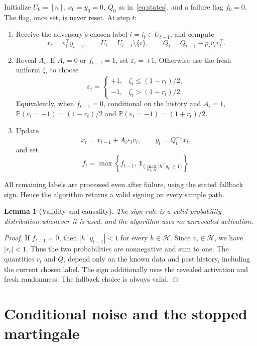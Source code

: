 \documentclass[11pt,a4paper]{article}
\numberwithin{equation}{section}
\newtheorem{lemma}[theorem]{Lemma}
\theoremstyle{remark}
\newcommand{\Pp}{\mathbb P}
\newcommand{\HH}{\mathcal H}
\newcommand{\ind}{\mathbf 1}
\begin{document}
Initialize $U_0=[n]$, $x_0=y_0=0$, $Q_0$ as in~\eqref{eq:states}, and a
failure flag $f_0=0$. The flag, once set, is never reset. At step $t$:
\begin{enumerate}
 \item Receive the adversary's chosen label $i=i_t\in U_{t-1}$, and compute
 \[
 r_t=v_i^\top y_{t-1},\qquad U_t=U_{t-1}\setminus\{i\},\qquad
 Q_t=Q_{t-1}-p_i v_iv_i^\top.
 \]
 \item Reveal $A_i$. If $A_i=0$ or $f_{t-1}=1$, set $\varepsilon_i=+1$.
 Otherwise use the fresh uniform $\zeta_t$ to choose
 \begin{equation}\label{eq:sign-rule}
 \varepsilon_i=
 \begin{cases}
 +1,&\zeta_t\le(1-r_t)/2,\\
 -1,&\zeta_t>(1-r_t)/2.
 \end{cases}
 \end{equation}
 Equivalently, when $f_{t-1}=0$, conditional on the history and $A_i=1$,
 $\Pp(\varepsilon_i=+1)=(1-r_t)/2$ and
 $\Pp(\varepsilon_i=-1)=(1+r_t)/2$.
 \item Update
 \[
 x_t=x_{t-1}+A_i\varepsilon_i v_i,\qquad y_t=Q_t^{-1}x_t,
 \]
 and set
 \begin{equation}\label{eq:failure-flag}
 f_t=\max\!\left\{f_{t-1},\,
 \ind_{\{\max_{h\in\HH}|h^\top y_t|\ge1\}}\right\}.
 \end{equation}
\end{enumerate}
All remaining labels are processed even after failure, using the stated
fallback sign. Hence the algorithm returns a valid signing on every
sample path.

\begin{lemma}[Validity and causality]
\label{lem:validity}
The sign rule is a valid probability distribution whenever it is used,
and the algorithm uses no unrevealed activation.
\end{lemma}
\begin{proof}
If $f_{t-1}=0$, then $|h^\top y_{t-1}|<1$ for every $h\in\HH$.
Since $v_i\in\HH$, we have $|r_t|<1$. Thus the two probabilities are
nonnegative and sum to one. The quantities $r_t$ and $Q_t$ depend only
on the known data and past history, including the current chosen label.
The sign additionally uses the revealed activation and fresh randomness.
The fallback choice is always valid.
\end{proof}

\section{Conditional noise and the stopped martingale}
\end{document}
